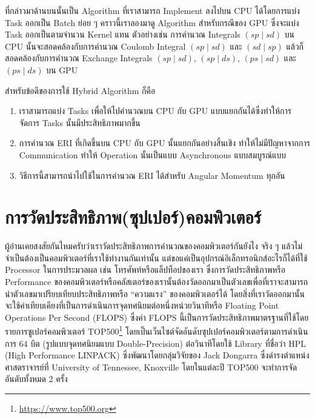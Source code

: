 ที่กล่าวมาด้านบนนั้นเป็น Algorithm ที่เราสามารถ Implement ลงไปบน CPU ได้โดยการแบ่ง Task ออกเป็น Batch ย่อย ๆ คราวนี้เราลองมาดู
Algorithm สำหรับกรณีของ GPU ซึ่งจะแบ่ง Task ออกเป็นตามจำนวน Kernel แทน ตัวอย่างเช่น การคำนวณ Integrals $(sp \mid sd)$
บน CPU นั้นจะสอดคล้องกับการคำนวณ Coulomb Integral $(sp \mid sd)$ และ $(sd \mid sp)$ แล้วก็สอดคล้องกับการคำนวณ
Exchange Integrals $(sp \mid sd)$, $(sp \mid ds)$, $(ps \mid sd)$ และ $(ps \mid ds)$ บน GPU

สำหรับข้อดีของการใช้ Hybrid Algorithm ก็คือ

\begin{enumerate}[topsep=0pt,noitemsep]
  \setlength\itemsep{1em}
  \item เราสามารถแบ่ง Tasks เพื่อให้ไปคำนวณบน CPU กับ GPU แบบแยกกันได้ซึ่งทำให้การจัดการ Tasks นั้นมีประสิทธิภาพมากขึ้น

  \item การคำนวณ ERI ที่เกิดขึ้นบน CPU กับ GPU นั้นแยกกันอย่างสิ้นเชิง ทำให้ไม่มีปัญหาจากการ Communication ทำให้ Operation
        นั้นเป็นแบบ Asynchronous แบบสมบูรณ์แบบ

  \item วิธีการนี้สามารถนำไปใช้ในการคำนวณ ERI ได้สำหรับ Angular Momentum ทุกอัน
\end{enumerate}

\section{การวัดประสิทธิภาพ(ซุปเปอร์)คอมพิวเตอร์}

ผู้อ่านเคยสงสัยกันไหมครับว่าเราวัดประสิทธิภาพการคำนวณของคอมพิวเตอร์กันยังไง จริง ๆ แล้วไม่จำเป็นต้องเป็นคอมพิวเตอร์ที่เราใช้ทำงานกันเท่านั้น
แต่ขอแค่เป็นอุปกรณ์อิเล็กทรอนิกส์อะไรก็ได้ที่ใช้ Processor ในการประมวลผล เช่น โทรศัพท์หรือแล็ปท็อปของเรา ซึ่งการวัดประสิทธิภาพหรือ
Performance ของคอมพิวเตอร์หรือคลัสเตอร์ของเรานั้นต้องวัดออกมาเป็นตัวเลขเพื่อที่เราจะสามารถนำตัวเลขมาเปรียบเทียบประสิทธิภาพหรือ
\enquote{ความแรง} ของคอมพิวเตอร์ได้ โดยสิ่งที่เราวัดออกมานั้นจะใช้ค่าเทียบเคียงที่เป็นการดำเนินการจุดทศนิยมต่อหนึ่งหน่วยวินาทีหรือ
Floating Point Operations Per Second (FLOPS)  ซึ่งค่า FLOPS นี้เป็นการวัดประสิทธิภาพมาตรฐานที่ใช้โดยรายการซูเปอร์คอมพิวเตอร์
TOP500\footnote{\url{https://www.top500.org}} โดยเป็นเว็นไซต์จัดอันดับซุปเปอร์คอมพิวเตอร์ตามการดำเนินการ 64 บิต
(รูปแบบจุดทศนิยมแบบ Double-Precision) ต่อวินาทีโดยใช้ Library ที่ชื่อว่า HPL (High Performance LINPACK) ซึ่งพัฒนาโดยกลุ่มวิจัยของ
Jack Dongarra ซึ่งดำรงตำแหน่งศาสตราจารย์ที่ University of Tennessee, Knoxville โดยในแต่ละปี TOP500 จะทำการจัดอันดับทั้งหมด 2
ครั้ง

